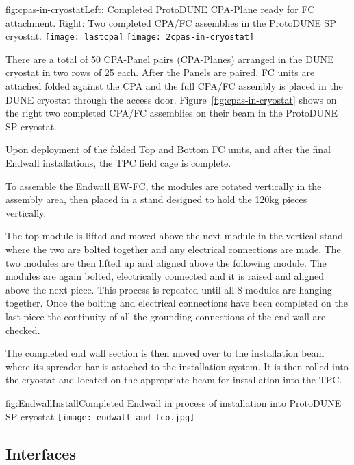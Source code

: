 \begin{dunefigure}{fig:cpas-in-cryostat}{Left: Completed ProtoDUNE CPA-Plane ready for FC attachment. Right: Two completed CPA/FC assemblies in the ProtoDUNE SP cryostat.}
\texttt{[image: lastcpa]}
\texttt{[image: 2cpas-in-cryostat]}
\end{dunefigure}

There are a total of 50 CPA-Panel pairs (CPA-Planes) arranged in the DUNE cryostat in two rows of 25 each.  After the Panels are paired, FC units are attached folded against the CPA and the full CPA/FC assembly is placed in the DUNE cryostat through the access door.  Figure~\ref{fig:cpas-in-cryostat} shows on the right two completed CPA/FC assemblies on their beam in the ProtoDUNE SP cryostat.


Upon deployment of the folded Top and Bottom FC units, and after the final Endwall installations, the TPC field cage is complete.

To assemble the Endwall EW-FC, the modules are rotated vertically in the assembly area, then placed in a stand designed to hold the 120kg pieces vertically.

The top module is lifted and moved above the next module in the vertical stand where the two are bolted together and any electrical connections are made. The two modules are then lifted up and aligned above the following module.  The modules are again bolted, electrically connected and it is raised and aligned above the next piece.  This process is repeated until all 8 modules are hanging together.  Once the bolting and electrical connections have been completed on the last piece the continuity of all the grounding connections of the end wall are checked.
 
The completed end wall section is then moved over to the installation beam where its spreader bar is attached to the installation system.  It is then rolled into the cryostat and located on the appropriate beam for installation into the TPC.

\begin{dunefigure}{fig:EndwallInstall}{Completed Endwall in process of installation into ProtoDUNE SP cryostat}
\texttt{[image: endwall\_and\_tco.jpg]}
\end{dunefigure}



\subsection{Interfaces}
\label{sec:fdsp-hv-interface}

